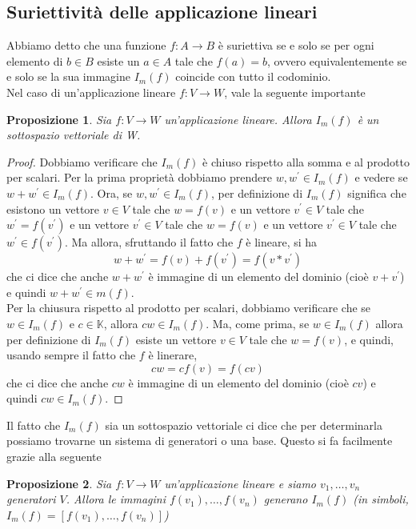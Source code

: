 \documentclass{book}
\newtheorem{proposizione}{Proposizione}
\begin{document}
\subsection{Suriettività delle applicazione lineari}
Abbiamo detto che una funzione $f: A\to B$ è suriettiva se e solo se per ogni elemento di
$b\in B$ esiste un $a\in A$ tale che $f(a)=b$, ovvero equivalentemente se e solo se la sua
immagine $I_m(f)$ coincide con tutto il codominio.\\
Nel caso di un'applicazione lineare $f:V\to W$, vale la seguente importante
\begin{proposizione}
  Sia $f: V\to W$ un'applicazione lineare. Allora $I_m(f)$ è un sottospazio vettoriale di W.
\end{proposizione}
\begin{proof}
  Dobbiamo verificare che $I_m(f)$ è chiuso rispetto alla somma e al prodotto per scalari. Per la
  prima proprietà dobbiamo prendere $w,w^\prime\in I_m(f)$ e vedere se $w+w^\prime\in I_m(f)$. Ora,
  se $w,w^\prime\in I_m(f)$, per definizione di $I_m(f)$ significa che esistono un vettore
  $v\in V$ tale che $w=f(v)$ e un vettore $v^\prime\in V$ tale che $w^\prime=f(v^\prime)$ e un
  vettore $v^\prime\in V$ tale che $w=f(v)$ e un vettore $v^\prime \in V$ tale che
  $w^\prime\in f(v^\prime)$. Ma allora, sfruttando il fatto che $f$ è lineare, si ha
  \begin{equation*}
    w+w^\prime=f(v)+f(v^\prime)=f(v*v^\prime)
  \end{equation*}
  che ci dice che anche $w+w^\prime$ è immagine di un elemento del dominio (cioè $v+v^\prime$) e
  quindi $w+w^\prime\in m(f)$.\\
  Per la chiusura rispetto al prodotto per scalari, dobbiamo verificare che se $w\in I_m(f)$ e
  $c\in\mathds{K}$, allora $cw\in I_m(f)$. Ma, come prima, se $w\in I_m(f)$ allora per
  definizione di $I_m(f)$ esiste un vettore $v\in V$ tale che $w=f(v)$, e quindi, usando sempre
  il fatto che $f$ è linerare,
  \begin{equation*}
    cw=cf(v)=f(cv)
  \end{equation*}
  che ci dice che anche $cw$ è immagine di un elemento del dominio (cioè $cv$) e quindi $cw\in I_m(f)$.
\end{proof}
Il fatto che $I_m(f)$ sia un sottospazio vettoriale ci dice che per determinarla possiamo trovarne un sistema di
generatori o una base. Questo si fa facilmente grazie alla seguente
\begin{proposizione}
  Sia $f:V\to W$ un'applicazione lineare e siamo $v_1,\dots,v_n$ generatori $V$.
  Allora le immagini $f(v_1),\dots,f(v_n)$ generano $I_m(f)$ (in simboli, $I_m(f)=[f(v_1),\dots,f(v_n)]$)
\end{proposizione}
\end{document}
